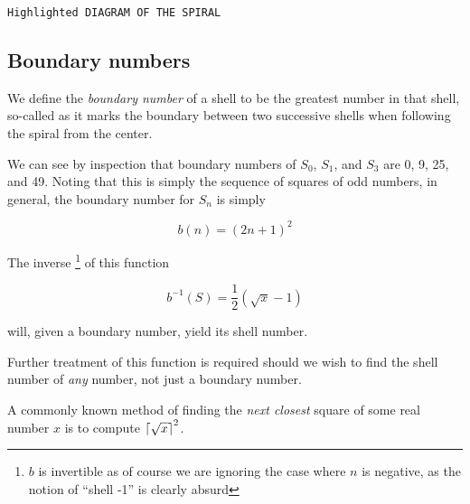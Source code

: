 \documentclass[11pt]{article}
\DeclarePairedDelimiter{\ceil}{\lceil}{\rceil}
\begin{document}
\begin{verbatim}
Highlighted DIAGRAM OF THE SPIRAL
\end{verbatim}

\subsection{Boundary numbers}
\label{sec:org7992758}
We define the \emph{boundary number} of a shell to be the greatest number in that
shell, so-called as it marks the boundary between two successive shells when
following the spiral from the center.

We can see by inspection that boundary numbers of \(S_0\), \(S_1\), and \(S_3\) are 0,
9, 25, and 49. Noting that this is simply the sequence of squares of odd
numbers, in general, the boundary number for \(S_n\) is
simply

$$ b(n) = (2n + 1)^2 $$

The inverse \footnote{\(b\) is invertible as of course we are ignoring the
case where \(n\) is negative, as the notion of ``shell -1'' is clearly absurd} of this function 

$$ b^{-1}(S) = \frac{1}{2} (\sqrt{x} - 1) $$

will, given a boundary number, yield its shell number.


Further treatment of this function is required should we wish to find the shell
number of \emph{any} number, not just a boundary number.

A commonly known method of finding the \emph{next closest} square of some real number
\(x\) is to compute \(\ceil*{\sqrt{x}} ^ 2\).
\end{document}
